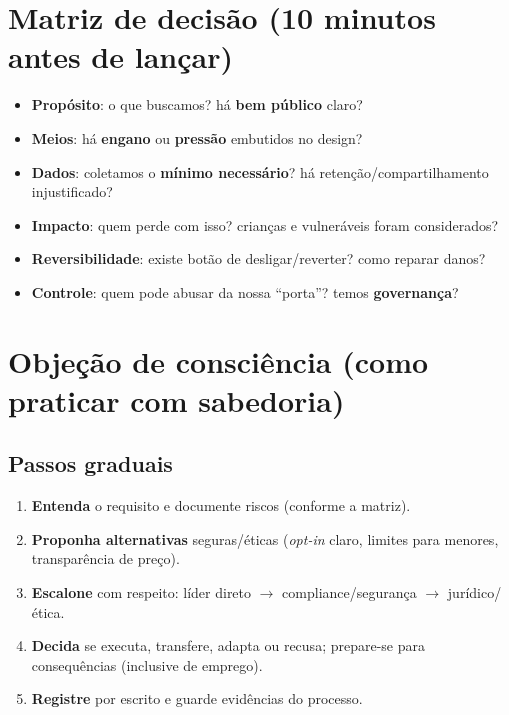 \section{Matriz de decisão (10 minutos antes de lançar)}
\begin{checklist}[title={6 perguntas NIC+}]
\begin{itemize}[leftmargin=*,noitemsep]
  \item \textbf{Propósito}: o que buscamos? há \textbf{bem público} claro?
  \item \textbf{Meios}: há \textbf{engano} ou \textbf{pressão} embutidos no design?
  \item \textbf{Dados}: coletamos o \textbf{mínimo necessário}? há retenção/compartilhamento injustificado?
  \item \textbf{Impacto}: quem perde com isso? crianças e vulneráveis foram considerados?
  \item \textbf{Reversibilidade}: existe botão de desligar/reverter? como reparar danos?
  \item \textbf{Controle}: quem pode abusar da nossa ``porta''? temos \textbf{governança}?
\end{itemize}
\end{checklist}

\section{Objeção de consciência (como praticar com sabedoria)}
\subsection*{Passos graduais}
\begin{enumerate}[leftmargin=*,nosep]
  \item \textbf{Entenda} o requisito e documente riscos (conforme a matriz).
  \item \textbf{Proponha alternativas} seguras/éticas (\emph{opt-in} claro, limites para menores, transparência de preço).
  \item \textbf{Escalone} com respeito: líder direto $\rightarrow$ compliance/segurança $\rightarrow$ jurídico/ética.
  \item \textbf{Decida} se executa, transfere, adapta ou recusa; prepare-se para consequências (inclusive de emprego).
  \item \textbf{Registre} por escrito e guarde evidências do processo.
\end{enumerate}

